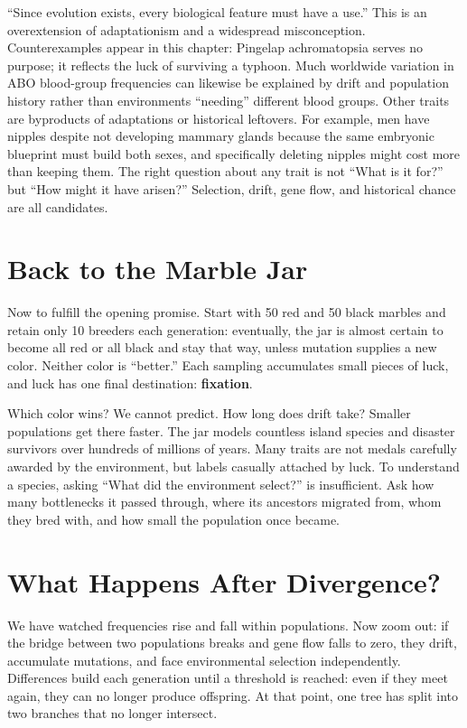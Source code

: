 \begin{wuqu}
``Since evolution exists, every biological feature must have a use.'' This is an overextension of adaptationism and a widespread misconception. Counterexamples appear in this chapter: Pingelap achromatopsia serves no purpose; it reflects the luck of surviving a typhoon. Much worldwide variation in ABO blood-group frequencies can likewise be explained by drift and population history rather than environments ``needing'' different blood groups. Other traits are byproducts of adaptations or historical leftovers. For example, men have nipples despite not developing mammary glands because the same embryonic blueprint must build both sexes, and specifically deleting nipples might cost more than keeping them. The right question about any trait is not ``What is it for?'' but ``How might it have arisen?'' Selection, drift, gene flow, and historical chance are all candidates.
\end{wuqu}

\section{Back to the Marble Jar}

Now to fulfill the opening promise. Start with 50 red and 50 black marbles and retain only 10 breeders each generation: eventually, the jar is almost certain to become all red or all black and stay that way, unless mutation supplies a new color. Neither color is ``better.'' Each sampling accumulates small pieces of luck, and luck has one final destination: \textbf{fixation}.

Which color wins? We cannot predict. How long does drift take? Smaller populations get there faster. The jar models countless island species and disaster survivors over hundreds of millions of years. Many traits are not medals carefully awarded by the environment, but labels casually attached by luck. To understand a species, asking ``What did the environment select?'' is insufficient. Ask how many bottlenecks it passed through, where its ancestors migrated from, whom they bred with, and how small the population once became.

\section{What Happens After Divergence?}

We have watched frequencies rise and fall within populations. Now zoom out: if the bridge between two populations breaks and gene flow falls to zero, they drift, accumulate mutations, and face environmental selection independently. Differences build each generation until a threshold is reached: even if they meet again, they can no longer produce offspring. At that point, one tree has split into two branches that no longer intersect.


